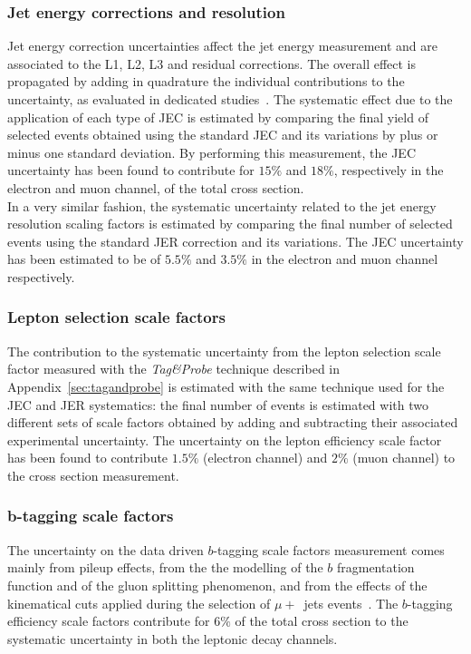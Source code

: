\subsubsection{Jet energy corrections and resolution}
Jet energy correction uncertainties affect the jet energy
measurement and are associated to the L1, L2, L3 
and residual corrections. %
The overall effect is propagated by adding in
quadrature the individual contributions to the uncertainty, as evaluated
in dedicated studies~\cite{jetmet010}. The systematic effect due
to the application of each type of JEC is estimated by comparing 
the final yield of selected events
obtained using the standard JEC and its variations
by plus or minus one standard deviation.
By performing this measurement, the JEC uncertainty 
has been found to contribute for $15\%$ and $18\%$, respectively 
in the electron and muon channel, of the total 
cross section.  \\

In a very similar fashion, the systematic uncertainty related to 
the jet energy resolution scaling factors %
 is estimated by comparing
the final number of selected events 
using the standard JER correction and its variations.
The JEC uncertainty has been estimated to be of $5.5\%$ and $3.5\%$
in the electron and muon channel respectively.

\subsubsection{Lepton selection scale factors}

The contribution to the systematic uncertainty 
from the lepton selection scale factor measured with the 
\textit{Tag\&Probe} technique described in Appendix~\ref{sec:tagandprobe}
is estimated with the same technique 
used for the JEC and JER systematics:
the final number of events is estimated
with two different sets of scale factors obtained by adding and subtracting
their associated experimental uncertainty.
The uncertainty on the lepton efficiency scale factor has 
been found to contribute $1.5\%$ (electron channel) 
and $2\%$ (muon channel) to the cross section measurement.

\subsubsection{b-tagging scale factors}

The uncertainty on the data driven $b$-tagging scale factors measurement 
comes mainly from pileup effects, from the the modelling of the $b$ fragmentation 
function and of the gluon splitting phenomenon, and from 
the effects of the kinematical cuts applied during the selection of
$\mu +$~jets events~\cite{btagPOG2}.
The $b$-tagging efficiency scale factors
contribute for $6\%$ of the total cross section to the systematic 
uncertainty in both the leptonic decay channels.

